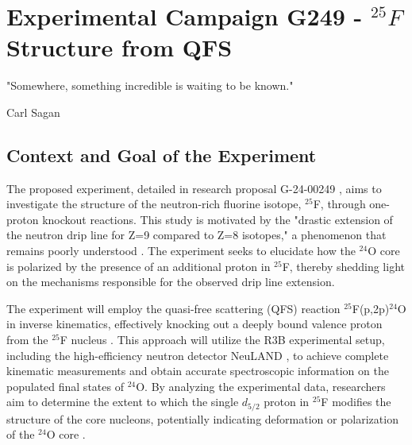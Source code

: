 
%

\makeatletter
\newcommand{\ntifpkgloaded}{%
  \@ifpackageloaded%
}
\makeatother


\chapter{Experimental Campaign G249 - $^{25}F$ Structure from QFS}
\label{cha:experiment}

\epigraph{
	"Somewhere, something incredible is waiting to be known."
}{Carl Sagan}



\section{Context and Goal of the Experiment} %
\label{sec:contex_goal_experiment}

The proposed experiment, detailed in research proposal G-24-00249 \cite{panin2024neutron}, aims to investigate the structure of the neutron-rich fluorine isotope, $^{25}$F, through one-proton knockout reactions. This study is motivated by the "drastic extension of the neutron drip line for Z=9 compared to Z=8 isotopes," a phenomenon that remains poorly understood \cite{ahn_location_2019}. The experiment seeks to elucidate how the $^{24}$O core is polarized by the presence of an additional proton in $^{25}$F, thereby shedding light on the mechanisms responsible for the observed drip line extension.

The experiment will employ the quasi-free scattering (\gls{QFS}) reaction $^{25}$F(p,2p)$^{24}$O in inverse kinematics, effectively knocking out a deeply bound valence proton from the $^{25}$F nucleus \cite{panin_exclusive_2016}. This approach will utilize the \gls{R3B} experimental setup, including the high-efficiency neutron detector NeuLAND \cite{boretzky_neuland_2021}, to achieve complete kinematic measurements and obtain accurate spectroscopic information on the populated final states of $^{24}$O. By analyzing the experimental data, researchers aim to determine the extent to which the single $d_{5/2}$ proton in $^{25}$F modifies the structure of the core nucleons, potentially indicating deformation or polarization of the $^{24}$O core \cite{macchiavelli_core_2020}.

